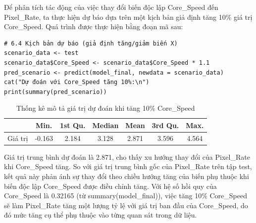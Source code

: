 Để phân tích tác động của việc thay đổi biến độc lập Core\_Speed đến Pixel\_Rate, ta thực hiện dự báo dựa trên một kịch bản giả định tăng 10\% giá trị Core\_Speed. Quá trình được thực hiện bằng đoạn mã sau:

\begin{verbatim}
# 6.4 Kịch bản dự báo (giả định tăng/giảm biến X)
scenario_data <- test
scenario_data$Core_Speed <- scenario_data$Core_Speed * 1.1
pred_scenario <- predict(model_final, newdata = scenario_data)
cat("Dự đoán với Core_Speed tăng 10%:\n")
print(summary(pred_scenario))
\end{verbatim}

\newpage
\begin{table}[!h]
\centering
\caption{Thống kê mô tả giá trị dự đoán khi tăng 10\% Core\_Speed}
\begin{tabular}{lcccccc}
\hline
 & Min. & 1st Qu. & Median & Mean & 3rd Qu. & Max. \\
\hline
Giá trị & -0.163 & 2.184 & 3.128 & 2.871 & 3.596 & 4.564 \\
\hline
\end{tabular}
\end{table}

Giá trị trung bình dự đoán là 2.871, cho thấy xu hướng thay đổi của Pixel\_Rate khi Core\_Speed tăng. So với giá trị trung bình gốc của Pixel\_Rate trên tập test, kết quả này phản ánh sự thay đổi theo chiều hướng tăng của biến phụ thuộc khi biến độc lập Core\_Speed được điều chỉnh tăng. Với hệ số hồi quy của Core\_Speed là 0.32165 (từ summary(model\_final)), việc tăng 10\% Core\_Speed sẽ làm Pixel\_Rate tăng một lượng tỷ lệ với giá trị ban đầu của Core\_Speed, do đó mức tăng cụ thể phụ thuộc vào từng quan sát trong dữ liệu.